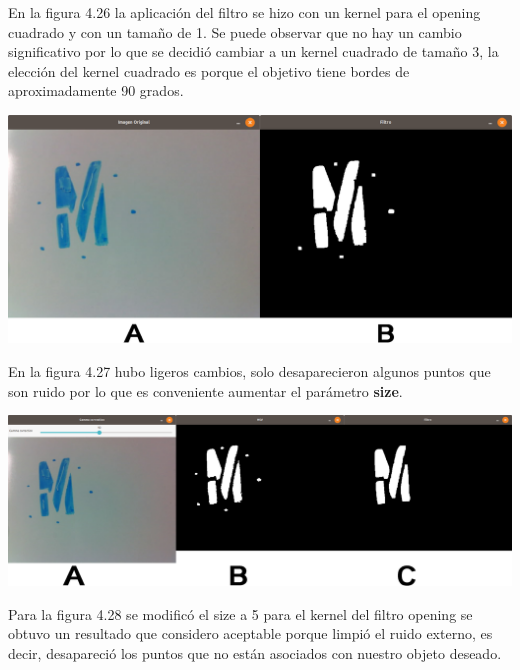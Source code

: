 En la figura 4.26 la aplicación del filtro se hizo con un kernel para el opening cuadrado y con un tamaño de 1.
Se puede observar que no hay un cambio significativo por lo que se decidió cambiar a un kernel cuadrado
de tamaño 3, la elección del kernel cuadrado es porque el objetivo tiene bordes de aproximadamente 90
grados.
\begin{center}
	\includegraphics[width=0.7 \textwidth]{Contenido/Cuerpo/Capitulo4/Fig17.eps}
	\label{Fig9}
\end{center}
En la figura 4.27 hubo ligeros cambios, solo desaparecieron algunos puntos que son ruido por lo que es conveniente aumentar
el parámetro \textbf{size}.
\begin{center}
	\includegraphics[width=1.0 \textwidth]{Contenido/Cuerpo/Capitulo4/Fig15.eps}
	\label{Fig9}
\end{center}
Para la figura 4.28 se modificó el size a 5 para el kernel del filtro opening se obtuvo un resultado que considero aceptable porque
limpió el ruido externo, es decir, desapareció los puntos que no están asociados con nuestro objeto deseado.


